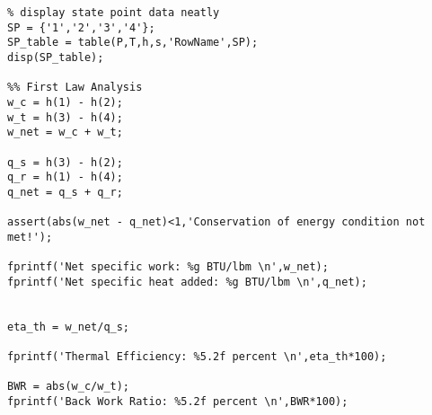\begin{lstlisting}
% display state point data neatly
SP = {'1','2','3','4'};
SP_table = table(P,T,h,s,'RowName',SP);
disp(SP_table);

%% First Law Analysis
w_c = h(1) - h(2);
w_t = h(3) - h(4);
w_net = w_c + w_t;

q_s = h(3) - h(2);
q_r = h(1) - h(4);
q_net = q_s + q_r;

assert(abs(w_net - q_net)<1,'Conservation of energy condition not met!');

fprintf('Net specific work: %g BTU/lbm \n',w_net);
fprintf('Net specific heat added: %g BTU/lbm \n',q_net);


eta_th = w_net/q_s;

fprintf('Thermal Efficiency: %5.2f percent \n',eta_th*100);

BWR = abs(w_c/w_t);
fprintf('Back Work Ratio: %5.2f percent \n',BWR*100);
\end{lstlisting}




